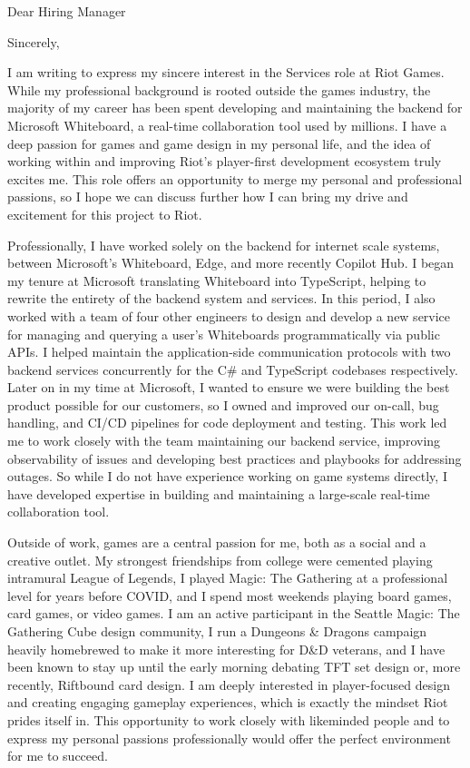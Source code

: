 \documentclass[12pt,a4paper,sans]{moderncv}
\begin{document}
\date{\today}
\opening{Dear Hiring Manager}
\closing{Sincerely,}

\makelettertitle

I am writing to express my sincere interest in the Services role at Riot Games. While my professional background is rooted outside the games industry, the majority of my career has been spent developing and maintaining the backend for Microsoft Whiteboard, a real-time collaboration tool used by millions.  I have a deep passion for games and game design in my personal life, and the idea of working within and improving Riot's player-first development ecosystem truly excites me.  This role offers an opportunity to merge my personal and professional passions, so I hope we can discuss further how I can bring my drive and excitement for this project to Riot.

Professionally, I have worked solely on the backend for internet scale systems, between Microsoft's Whiteboard, Edge, and more recently Copilot Hub.  I began my tenure at Microsoft translating Whiteboard into TypeScript, helping to rewrite the entirety of the backend system and services.  In this period, I also worked with a team of four other engineers to design and develop a new service for managing and querying a user's Whiteboards programmatically via public APIs.  I helped maintain the application-side communication protocols with two backend services concurrently for the C\# and TypeScript codebases respectively.  Later on in my time at Microsoft, I wanted to ensure we were building the best product possible for our customers, so I owned and improved our on-call, bug handling, and CI/CD pipelines for code deployment and testing.  This work led me to work closely with the team maintaining our backend service, improving observability of issues and developing best practices and playbooks for addressing outages.  So while I do not have experience working on game systems directly, I have developed expertise in building and maintaining a large-scale real-time collaboration tool.

Outside of work, games are a central passion for me, both as a social and a creative outlet. My strongest friendships from college were cemented playing intramural League of Legends, I played Magic: The Gathering at a professional level for years before COVID, and I spend most weekends playing board games, card games, or video games. I am an active participant in the Seattle Magic: The Gathering Cube design community, I run a Dungeons \& Dragons campaign heavily homebrewed to make it more interesting for D\&D veterans, and I have been known to stay up until the early morning debating TFT set design or, more recently, Riftbound card design.  I am deeply interested in player-focused design and creating engaging gameplay experiences, which is exactly the mindset Riot prides itself in. This opportunity to work closely with likeminded people and to express my personal passions professionally would offer the perfect environment for me to succeed.
\end{document}
